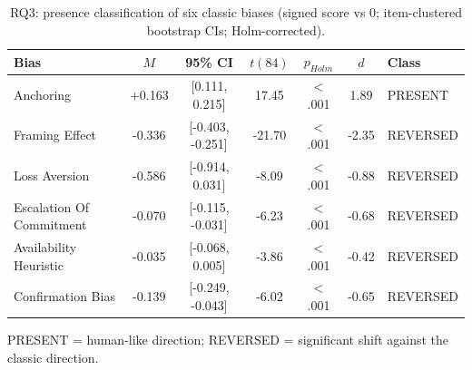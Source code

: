 \begin{table}[t]
\centering
\caption{RQ3: presence classification of six classic biases (signed score vs 0; item-clustered bootstrap CIs; Holm-corrected).}
\label{tab:rq3}
\small
\begin{tabular}{lcccccl}
\hline
Bias & $M$ & 95\% CI & $t(84)$ & $p_{Holm}$ & $d$ & Class \\
\hline
Anchoring & +0.163 & [0.111, 0.215] & 17.45 & $<$.001 & 1.89 & PRESENT \\
Framing Effect & -0.336 & [-0.403, -0.251] & -21.70 & $<$.001 & -2.35 & REVERSED \\
Loss Aversion & -0.586 & [-0.914, 0.031] & -8.09 & $<$.001 & -0.88 & REVERSED \\
Escalation Of Commitment & -0.070 & [-0.115, -0.031] & -6.23 & $<$.001 & -0.68 & REVERSED \\
Availability Heuristic & -0.035 & [-0.068, 0.005] & -3.86 & $<$.001 & -0.42 & REVERSED \\
Confirmation Bias & -0.139 & [-0.249, -0.043] & -6.02 & $<$.001 & -0.65 & REVERSED \\
\hline
\end{tabular}
\par\smallskip\footnotesize PRESENT = human-like direction; REVERSED = significant shift against the classic direction.
\end{table}
